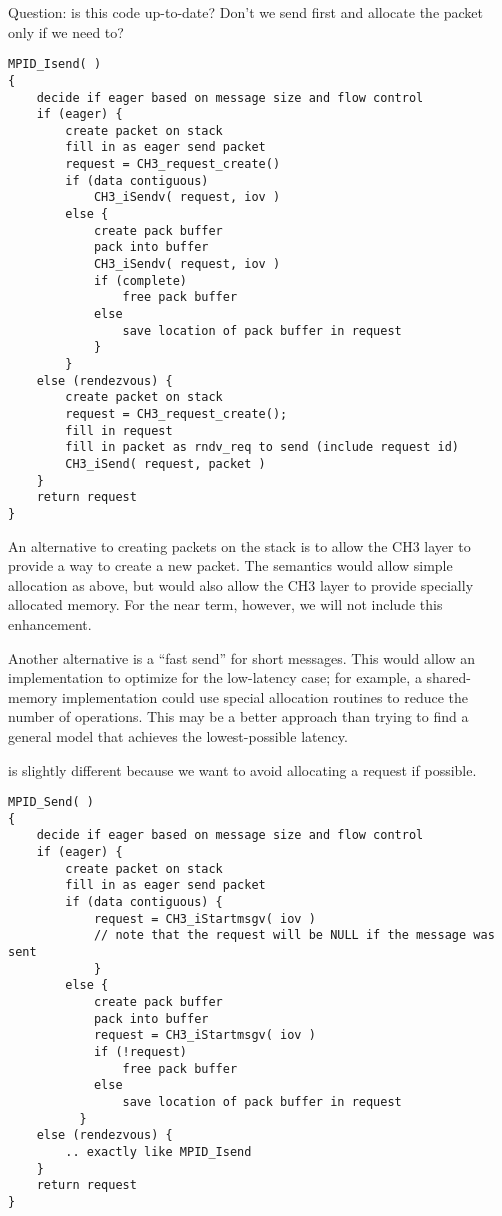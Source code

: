 \documentclass{article}
\begin{document}
Question: is this code up-to-date?  Don't we send first and allocate
the packet only if we need to?
\begin{verbatim}
MPID_Isend( )
{
    decide if eager based on message size and flow control
    if (eager) {
        create packet on stack
        fill in as eager send packet
        request = CH3_request_create()
        if (data contiguous)
            CH3_iSendv( request, iov )
        else {
            create pack buffer
            pack into buffer
            CH3_iSendv( request, iov )
            if (complete)
                free pack buffer
            else
                save location of pack buffer in request
            }
        }
    else (rendezvous) {
        create packet on stack
        request = CH3_request_create();
        fill in request
        fill in packet as rndv_req to send (include request id)
        CH3_iSend( request, packet )
    } 
    return request
}
\end{verbatim}

An alternative to creating packets on the stack is to allow the CH3 layer to
provide a way to create a new packet. The semantics would allow simple
allocation as above, but would also allow the CH3 layer to provide specially
allocated memory.  For the near term, however, we will not include this
enhancement. 

Another alternative is a ``fast send'' for short messages.  This would
allow an implementation to optimize for the low-latency case; for
example, a shared-memory implementation could use special allocation
routines to reduce the number of operations.  This may be a better
approach than trying to find a general model that achieves the
lowest-possible latency.

 is slightly different because we want to avoid allocating a
request if possible.  

\begin{verbatim}
MPID_Send( )
{
    decide if eager based on message size and flow control
    if (eager) {
        create packet on stack
        fill in as eager send packet
        if (data contiguous) {
            request = CH3_iStartmsgv( iov )
            // note that the request will be NULL if the message was sent
            }
        else {
            create pack buffer
            pack into buffer
            request = CH3_iStartmsgv( iov )
            if (!request)
                free pack buffer
            else
                save location of pack buffer in request
          }
    else (rendezvous) {
        .. exactly like MPID_Isend
    } 
    return request
}
\end{verbatim}
\end{document}

